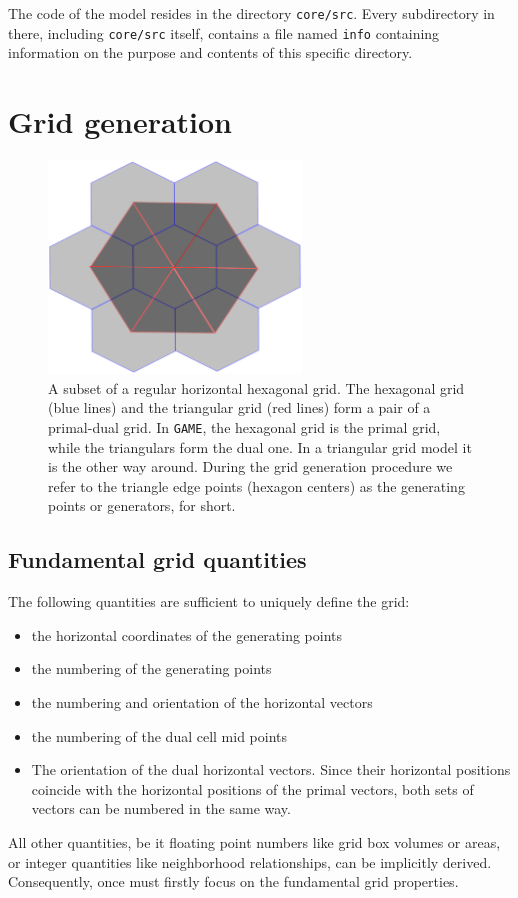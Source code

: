 \documentclass[10pt]{report}
\begin{document}
The code of the model resides in the directory \texttt{core/src}. Every subdirectory in there, including \texttt{core/src} itself, contains a file named \texttt{info} containing information on the purpose and contents of this specific directory.

\chapter{Grid generation}
\label{chap:grid_generation}

\begin{figure}
\begin{center}
\includegraphics[width = 0.6\textwidth]{hexagonal_grid_0.pdf}
\caption{A subset of a regular horizontal hexagonal grid. The hexagonal grid (blue lines) and the triangular grid (red lines) form a pair of a primal-dual grid. In \texttt{GAME}, the hexagonal grid is the primal grid, while the triangulars form the dual one. In a triangular grid model it is the other way around. During the grid generation procedure we refer to the triangle edge points (hexagon centers) as the generating points or generators, for short.}
\label{fig:hexagonal_grid_0}
\end{center}
\end{figure}

\section{Fundamental grid quantities}
\label{sec:fundamental_grid_quantities}

The following quantities are sufficient to uniquely define the grid:

\begin{itemize}
\item the horizontal coordinates of the generating points
\item the numbering of the generating points
\item the numbering and orientation of the horizontal vectors
\item the numbering of the dual cell mid points
\item The orientation of the dual horizontal vectors. Since their horizontal positions coincide with the horizontal positions of the primal vectors, both sets of vectors can be numbered in the same way.
\end{itemize}
%
All other quantities, be it floating point numbers like grid box volumes or areas, or integer quantities like neighborhood relationships, can be implicitly derived. Consequently, once must firstly focus on the fundamental grid properties.
\end{document}
